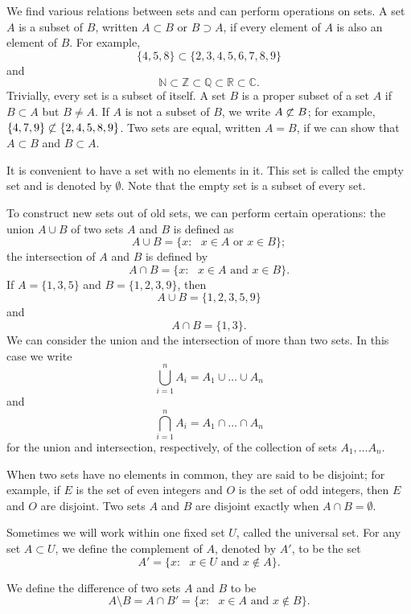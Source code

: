 We find various relations between sets and can perform operations on sets.  A set $A$ is a {\bfi subset\/} of $B$, written $A \subset B$\label{setcontain} or $B \supset A$, if every element of $A$ is also an element of $B$.  For example,  
$$
\{4,5,8\} \subset \{2, 3, 4, 5, 6, 7, 8, 9 \}
$$
and
$$
{\mathbb N} \subset {\mathbb Z} \subset {\mathbb Q} \subset {\mathbb R} \subset {\mathbb C}.
$$
Trivially, every set is a subset of itself.  A set $B$ is a {\bfi proper subset\/} of a set $A$ if $B \subset A$ but $B \neq A$. If $A$ is not a subset of $B$, we write $A \not\subset B$; for example, $\{4, 7, 9\} \not\subset \{2, 4, 5,  8, 9 \}$.  Two sets are {\bfi equal}, written $A = B$, if we can show that $A \subset B$ and $B \subset A$.  

It is convenient to have a set with no elements in it.  This set is called the {\bfi empty set\/} and is denoted by $\emptyset$\label{theemptyset}.  Note that the empty set is a subset of every set.  

To construct new sets out of old sets, we can perform certain operations: the {\bfi union\/} $A \cup B$ of two sets $A$ and $B$ is defined as  
$$
A \cup B\label{union} = \{x : \mbox{ $x \in A$ or $x \in B$} \};
$$
the {\bfi intersection\/} of $A$ and $B$  is defined by
$$
A \cap B\label{intersection} = \{x : \mbox{ $x \in A$ and $x \in B$} \}.
$$
If $A = \{1, 3, 5\}$ and $B = \{ 1, 2, 3, 9 \}$, then
$$
A \cup B = \{1, 2, 3, 5, 9 \}
$$
and
$$
A \cap B = \{ 1, 3 \}.
$$
We can consider the union and the intersection of more than two sets.  In this case we write 
$$
\bigcup_{i = 1}^{n} A_{i} = A_{1} \cup \ldots \cup A_n
$$
and
$$
\bigcap_{i = 1}^{n} A_{i} = A_{1} \cap \ldots \cap A_n
$$
for the union and intersection, respectively, of the collection of sets $A_1, \ldots A_n$.

When two sets have no elements in common, they are said to be {\bfi disjoint}; for example, if $E$ is the set of even integers and $O$ is the set of odd integers, then $E$ and $O$ are disjoint.  Two sets $A$ and $B$ are disjoint exactly when $A \cap B = \emptyset$. 

Sometimes we will work within one fixed set $U$, called the {\bfi universal set}.  For any set $A \subset U$, we define the {\bfi complement\/} of $A$, denoted by $A'$\label{setcomplement}, to be the set 
$$
A' = \{ x : \mbox{ $x \in U$ and $x \notin A$} \}.
$$

We define the {\bfi difference\/} of two sets $A$ and $B$ to be
$$
A \setminus B\label{setdifference} = A \cap B'  = \{ x : \mbox{ $x \in A$ and $x \notin B$} \}.
$$
 
